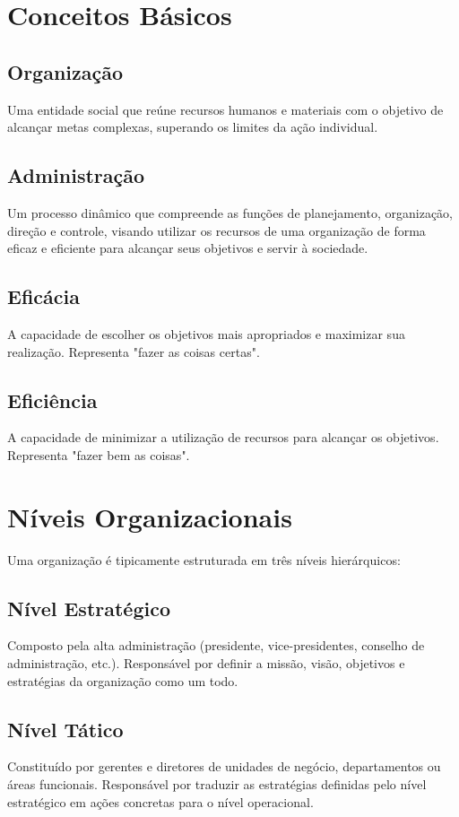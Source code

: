 \section{Conceitos Básicos}

\subsection{Organização}
Uma entidade social que reúne recursos humanos e materiais com o objetivo de alcançar metas complexas, superando os limites da ação individual.

\subsection{Administração}
Um processo dinâmico que compreende as funções de planejamento, organização, direção e controle, visando utilizar os recursos de uma organização de forma eficaz e eficiente para alcançar seus objetivos e servir à sociedade.

\subsection{Eficácia}
A capacidade de escolher os objetivos mais apropriados e maximizar sua realização. Representa "fazer as coisas certas".

\subsection{Eficiência}
A capacidade de minimizar a utilização de recursos para alcançar os objetivos. Representa "fazer bem as coisas".

\section{Níveis Organizacionais}

Uma organização é tipicamente estruturada em três níveis hierárquicos:

\subsection{Nível Estratégico}
Composto pela alta administração (presidente, vice-presidentes, conselho de administração, etc.). Responsável por definir a missão, visão, objetivos e estratégias da organização como um todo.

\subsection{Nível Tático}
Constituído por gerentes e diretores de unidades de negócio, departamentos ou áreas funcionais. Responsável por traduzir as estratégias definidas pelo nível estratégico em ações concretas para o nível operacional.

